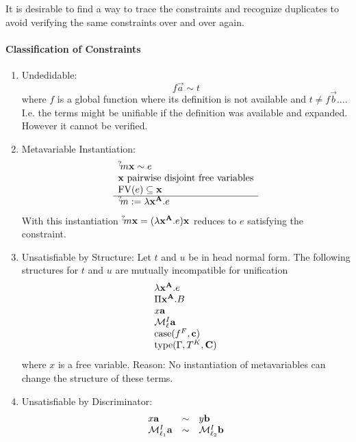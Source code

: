 It is desirable to find a way to trace the constraints and recognize duplicates
to avoid verifying the same constraints over and over again.






\paragraph{Classification of Constraints}

\begin{enumerate}
    \item Undedidable:
        $$
            f \vec a \sim t
        $$
        where $f$ is a global function where its definition is not available and
        $t \ne f \vec b \ldots$.
        I.e. the terms might be unifiable if the definition
        was available and expanded. However it cannot be verified.

    \item Metavariable Instantiation:
        $$
        \begin{array}{l} 
            {{}^? \kern-0.2em m} {\mathbf x} \sim e
            \\
            {\mathbf x} \text{ pairwise disjoint free variables}
            \\
            {\text{FV}}(e) \subseteq {\mathbf x}
         \\ \hline 
            {{}^? \kern-0.2em m} := \lambda {{\mathbf x}^{{\mathbf A}}}. e
         \end{array}
        $$
        With this instantiation ${{}^? \kern-0.2em m} {\mathbf x} = (\lambda {{\mathbf x}^{{\mathbf A}}} .e) {\mathbf x}$ reduces to $e$ satisfying the constraint.

    \item Unsatisfiable by Structure: Let $t$ and $u$ be in head normal form.
        The following structures for $t$ and $u$ are mutually incompatible for
        unification
        $$
        \begin{array}{l}
            \lambda {{\mathbf x}^{{\mathbf A}}}. e
            \\
            \Pi {{\mathbf x}^{{\mathbf A}}}. B
            \\
            x {\mathbf a}
            \\
            {\cal M}^I_\ell {\mathbf a}
            \\
            {\text{case}}(f^F , {\mathbf c})
            \\
            {\text{type}}(\Gamma , T^K , {\mathbf C})
        \end{array}
        $$
        where $x$ is a free variable. Reason: No instantiation of metavariables
        can change the structure of these terms.

    \item Unsatisfiable by Discriminator:
        $$
        \begin{array}{lll}
            x {\mathbf a} &\sim& y {\mathbf b}
            \\
            {\cal M}^I_{\ell_1} {\mathbf a} &\sim& {\cal M}^I_{\ell_2} {\mathbf b}
        \end{array}
        $$
\end{enumerate}








